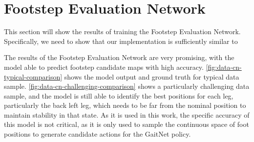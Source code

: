 \section{Footstep Evaluation Network}

\begin{todo}
  This section will show the results of training the
  Footstep Evaluation Network. Specifically, we need to show that
  our implementation is sufficiently similar to \cite{bratta_contactnet_2024}
\end{todo}

The results of the Footstep Evaluation Network are very promising,
with the model able to
predict footstep candidate maps with high accuracy.
\autoref{fig:data-cn-typical-comparison}
shows the model output and ground truth for typical data sample.
\autoref{fig:data-cn-challenging-comparison}
shows a particularly challenging data sample, and the model is still
able to identify the best positions for each leg,
particularly the back left leg, which needs to be far from the
nominal position to maintain stability in that state. As it is used
in this work,
the specific accuracy of this model is not critical, as it is only used
to sample the continuous space of foot positions to generate candidate
actions for the GaitNet policy.


